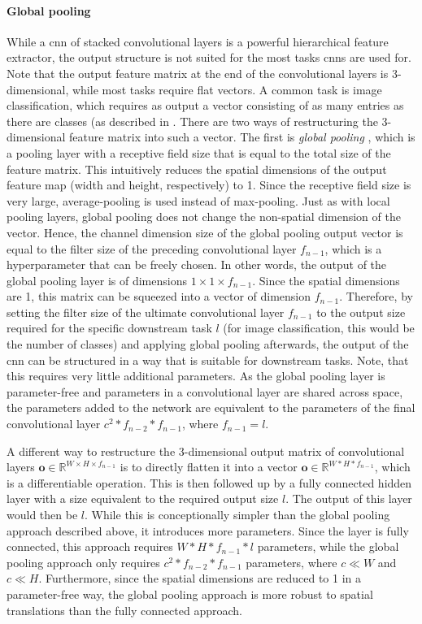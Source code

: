 \paragraph{Global pooling}
\label{p:global.pooling}
While a \gls{cnn} of stacked convolutional layers is a powerful hierarchical feature extractor, the output structure is not suited for the most tasks \glspl{cnn} are used for. Note that the output feature matrix at the end of the convolutional layers is 3-dimensional, while most tasks require flat vectors. A common task is image classification, which requires as output a vector consisting of as many entries as there are classes (as described in . There are two ways of restructuring the 3-dimensional feature matrix into such a vector. The first is \emph{global pooling} \citep{DBLP:journals/corr/LinCY13}, which is a pooling layer with a receptive field size that is equal to the total size of the feature matrix. This intuitively reduces the spatial dimensions of the output feature map (width and height, respectively) to 1. Since the receptive field size is very large, average-pooling is used instead of max-pooling. Just as with local pooling layers, global pooling does not change the non-spatial dimension of the vector. Hence, the channel dimension size of the global pooling output vector is equal to the filter size of the preceding convolutional layer $f_{n-1}$, which is a hyperparameter that can be freely chosen. In other words, the output of the global pooling layer is of dimensions $1\times1\times f_{n-1}$. Since the spatial dimensions are 1, this matrix can be squeezed into a vector of dimension $f_{n-1}$. Therefore, by setting the filter size of the ultimate convolutional layer $f_{n-1}$ to the output size required for the specific downstream task $l$ (for image classification, this would be the number of classes) and applying global pooling afterwards, the output of the \gls{cnn} can be structured in a way that is suitable for downstream tasks. Note, that this requires very little additional parameters. As the global pooling layer is parameter-free and parameters in a convolutional layer are shared across space, the parameters added to the network are equivalent to the parameters of the final convolutional layer $c^2*f_{n-2}*f_{n-1}$, where $f_{n-1}=l$.

A different way to restructure the 3-dimensional output matrix of convolutional layers $\textbf{o}\in\mathbb{R}^{W\times H\times f_{n-1}}$ is to directly flatten it into a vector $\textbf{o}\in\mathbb{R}^{W*H*f_{n-1}}$, which is a differentiable operation. This is then followed up by a fully connected hidden layer with a size equivalent to the required output size $l$. The output of this layer would then be $l$. While this is conceptionally simpler than the global pooling approach described above, it introduces more parameters. Since the layer is fully connected, this approach requires $W*H*f_{n-1}*l$ parameters, while the global pooling approach only requires $c^2*f_{n-2}*f_{n-1}$ parameters, where $c\ll W$ and $c\ll H$. Furthermore, since the spatial dimensions are reduced to 1 in a parameter-free way, the global pooling approach is more robust to spatial translations than the fully connected approach.


